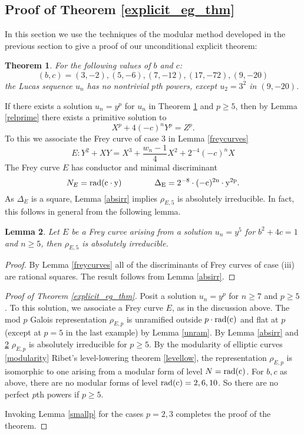 \documentclass[12pt]{amsart}
\newtheorem{thm}{Theorem}[section]
\newtheorem{lem}[thm]{Lemma}
\theoremstyle{definition}
\newcommand{\rad}{\rm rad}
\begin{document}
\subsection{Proof of Theorem \ref{explicit_eg_thm}}

In this section we use the techniques of the modular method developed in the previous section to give a proof of our unconditional explicit theorem:

\begin{thm}\label{explicit_eg_thm_inplace}
For the following values of $b$ and $c$:
\begin{equation}\label{examples} (b,c) = (3,-2), (5,-6), (7,-12), (17,-72), (9,-20) \end{equation}
the Lucas sequence $u_n$ has no nontrivial $p$th powers, except $u_2 = 3^2$ in $(9,-20)$.
\end{thm}


If there exists a solution $u_n = y^p$ for $u_n$ in Theorem \ref{explicit_eg_thm_inplace} and $p \geq 5$, then by Lemma \ref{relprime} there exists a primitive solution to 
\[ X^p + 4(-c)^n Y^p = Z^p. \]
To this we associate the Frey curve of case 3 in Lemma \ref{freycurves}
\[E: Y^2 + XY = X^3 + \frac{w_n - 1}{4} X^2 + 2^{-4}(-c)^nX \]
The Frey curve $E$ has conductor and minimal discriminant
\[ N_E =\rad(c \cdot y)  \qquad \qquad \Delta_E = 2^{-8} \cdot (-c)^{2n} \cdot y^{2p}. \]
As $\Delta_E$ is a square, Lemma \ref{absirr} implies $\rho_{E,5}$ is absolutely irreducible.  In fact, this follows in general from the following lemma.

\begin{lem}\label{frey5irr}
Let $E$ be a Frey curve arising from a solution $u_n = y^5$ for $b^2+4c = 1$ and $n\geq 5$, then $\rho_{E,5}$ is absolutely irreducible.
\end{lem}
\begin{proof}
By Lemma \ref{freycurves} all of the discriminants of Frey curves of case (iii) are rational squares.  The result follows from Lemma \ref{absirr}.
\end{proof}

\begin{proof}[Proof of Theorem \ref{explicit_eg_thm}]
Posit a solution $u_n = y^p$ for $n \geq 7$ and $p \geq 5$.  To this solution, we associate a Frey curve $E$, as in the discussion above.  The mod $p$ Galois representation $\rho_{E,p}$ is unramified outside $p\cdot \rad{(c)}$ and flat at $p$ (except at $p=5$ in the last example) by Lemma \ref{unram}.   By Lemma \ref{absirr} and \ref{frey5irr} $\rho_{E,p}$ is absolutely irreducible for $p\geq 5$.  By the modularity of elliptic curves \ref{modularity} Ribet's level-lowering theorem \ref{levellow}, the representation $\rho_{E,p}$ is isomorphic to one arising from a modular form of level $N = \rad(c)$.  For $b,c$ as above, there are no modular forms of level $\rad(c)=2,6,10$.  So there are no perfect $p$th powers if $p \geq 5$.

Invoking Lemma \ref{smallp} for the cases $p=2,3$ completes the proof of the theorem.
\end{proof}
\end{document}
